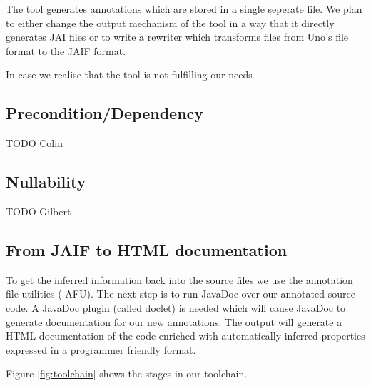 The tool generates annotations which are stored in a single seperate file. We plan
to either change the output mechanism of the tool in a way that it directly generates
JAI files or to write a rewriter which transforms files from Uno's file format to the
JAIF format.

In case we realise that the tool is not fulfilling our needs

\subsection{Precondition/Dependency}

TODO Colin

\subsection{Nullability}
\label{sec:Nullability}
TODO Gilbert


\subsection{From JAIF to HTML documentation}

To get the inferred information back into the source files we use the annotation 
file utilities (\cite{AFU} AFU). The next step is to run JavaDoc over our
annotated source code. A JavaDoc plugin (called doclet) is needed which will
cause JavaDoc to generate documentation for our new annotations. The output will
generate a HTML documentation of the code enriched with automatically inferred
properties expressed in a programmer friendly format.

Figure \ref{fig:toolchain} shows the stages in our toolchain.